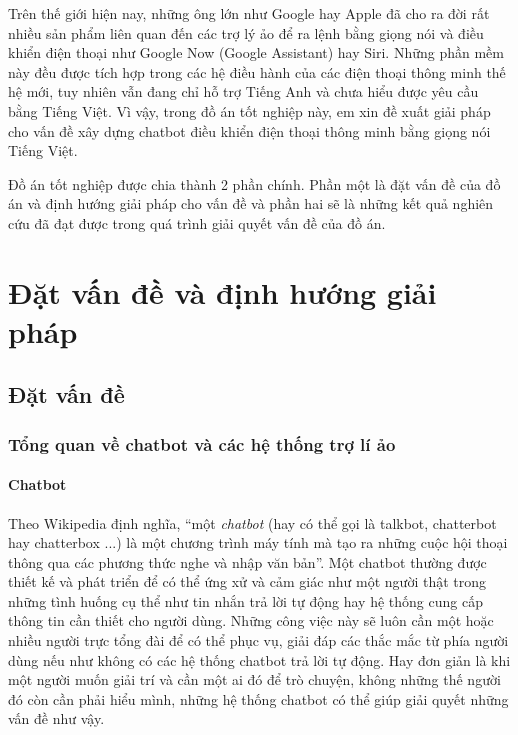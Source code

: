 \documentclass[12pt]{report}
\begin{document}
Trên thế giới hiện nay, những ông lớn như Google hay Apple đã cho ra đời rất nhiều sản phẩm liên quan đến các trợ lý ảo để ra lệnh bằng giọng nói và điều khiển điện thoại như Google Now (Google Assistant) hay Siri. Những phần mềm này đều được tích hợp trong các hệ điều hành của các điện thoại thông minh thế hệ mới, tuy nhiên vẫn đang chỉ hỗ trợ Tiếng Anh và chưa hiểu được yêu cầu bằng Tiếng Việt. Vì vậy, trong đồ án tốt nghiệp này, em xin đề xuất giải pháp cho vấn đề xây dựng chatbot điều khiển điện thoại thông minh bằng giọng nói Tiếng Việt.

Đồ án tốt nghiệp được chia thành 2 phần chính. Phần một là đặt vấn đề của đồ án và định hướng giải pháp cho vấn đề và phần hai sẽ là những kết quả nghiên cứu đã đạt được trong quá trình giải quyết vấn đề của đồ án.

\newpage
\setcounter{page}{1}

\newcommand{\alice}{A.L.I.C.E}

\part{Đặt vấn đề và định hướng giải pháp}

\startcontents[parts]

\chapter{Đặt vấn đề}
\section{Tổng quan về chatbot và các hệ thống trợ lí ảo}
\subsection{Chatbot}
Theo Wikipedia định nghĩa, ``một \textit{chatbot} (hay có thể gọi là talkbot, chatterbot hay chatterbox ...) là một chương trình máy tính mà tạo ra những cuộc hội thoại thông qua các phương thức nghe và nhập văn bản''\cite{chatbot-wiki}. Một chatbot thường được thiết kế và phát triển để có thể ứng xử và cảm giác như một người thật trong những tình huống cụ thể như tin nhắn trả lời tự động hay hệ thống cung cấp thông tin cần thiết cho người dùng. Những công việc này sẽ luôn cần một hoặc nhiều người trực tổng đài để có thể phục vụ, giải đáp các thắc mắc từ phía người dùng nếu như không có các hệ thống chatbot trả lời tự động. Hay đơn giản là khi một người muốn giải trí và cần một ai đó để trò chuyện, không những thế người đó còn cần phải hiểu mình, những hệ thống chatbot có thể giúp giải quyết những vấn đề như vậy.
\end{document}

